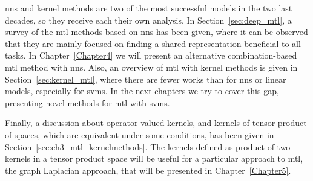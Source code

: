 \acrshort{nns} and kernel methods are two of the most successful models in the two last decades, so they receive each their own analysis.
In Section~\ref{sec:deep_mtl}, a survey of the \acrshort{mtl} methods based on \acrshort{nns} has been given, where it can be observed that they are mainly focused on finding a shared representation beneficial to all tasks. In Chapter~\ref{Chapter4} we will present an alternative combination-based \acrshort{mtl} method with \acrshort{nns}.
Also, an overview of \acrshort{mtl} with kernel methods is given in Section~\ref{sec:kernel_mtl}, where there are fewer works than for \acrshort{nns} or linear models, especially for \acrshort{svms}. 
In the next chapters we try to cover this gap, presenting novel methods for \acrshort{mtl} with \acrshort{svms}. 
%

Finally, a discussion about operator-valued kernels, and kernels of tensor product of spaces, which are equivalent under some conditions, has been given in Section~\ref{sec:ch3_mtl_kernelmethods}. The kernels defined as product of two kernels in a tensor product space will be useful for a particular approach to \acrshort{mtl}, the graph Laplacian approach, that will be presented in Chapter~\ref{Chapter5}.